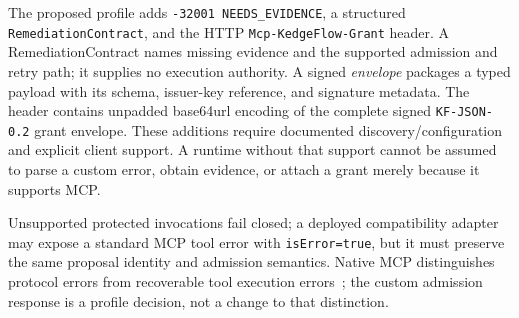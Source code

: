 The proposed profile adds \texttt{-32001 NEEDS\_EVIDENCE}, a structured \texttt{RemediationContract}, and the HTTP \texttt{Mcp-KedgeFlow-Grant} header. A RemediationContract names missing evidence and the supported admission and retry path; it supplies no execution authority. A signed \emph{envelope} packages a typed payload with its schema, issuer-key reference, and signature metadata. The header contains unpadded base64url encoding of the complete signed \texttt{KF-JSON-0.2} grant envelope. These additions require documented discovery/configuration and explicit client support. A runtime without that support cannot be assumed to parse a custom error, obtain evidence, or attach a grant merely because it supports MCP.

Unsupported protected invocations fail closed; a deployed compatibility adapter may expose a standard MCP tool error with \texttt{isError=true}, but it must preserve the same proposal identity and admission semantics. Native MCP distinguishes protocol errors from recoverable tool execution errors~\cite{mcp2026}; the custom admission response is a profile decision, not a change to that distinction.

